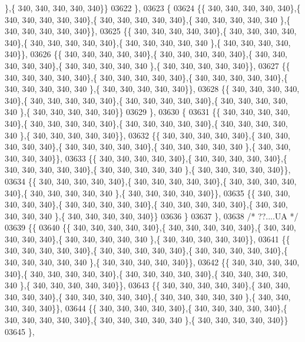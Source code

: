 \begin{DoxyCode}
      \},\{ 340, 340, 340, 340, 340\}\}
03622 \},
03623 \{
03624 \{\{ 340, 340, 340, 340, 340\},\{ 340, 340, 340, 340, 340\},\{ 340, 340, 340, 340, 340\},\{ 340, 340, 340, 340, 340
      \},\{ 340, 340, 340, 340, 340\}\},
03625 \{\{ 340, 340, 340, 340, 340\},\{ 340, 340, 340, 340, 340\},\{ 340, 340, 340, 340, 340\},\{ 340, 340, 340, 340, 340
      \},\{ 340, 340, 340, 340, 340\}\},
03626 \{\{ 340, 340, 340, 340, 340\},\{ 340, 340, 340, 340, 340\},\{ 340, 340, 340, 340, 340\},\{ 340, 340, 340, 340, 340
      \},\{ 340, 340, 340, 340, 340\}\},
03627 \{\{ 340, 340, 340, 340, 340\},\{ 340, 340, 340, 340, 340\},\{ 340, 340, 340, 340, 340\},\{ 340, 340, 340, 340, 340
      \},\{ 340, 340, 340, 340, 340\}\},
03628 \{\{ 340, 340, 340, 340, 340\},\{ 340, 340, 340, 340, 340\},\{ 340, 340, 340, 340, 340\},\{ 340, 340, 340, 340, 340
      \},\{ 340, 340, 340, 340, 340\}\}
03629 \},
03630 \{
03631 \{\{ 340, 340, 340, 340, 340\},\{ 340, 340, 340, 340, 340\},\{ 340, 340, 340, 340, 340\},\{ 340, 340, 340, 340, 340
      \},\{ 340, 340, 340, 340, 340\}\},
03632 \{\{ 340, 340, 340, 340, 340\},\{ 340, 340, 340, 340, 340\},\{ 340, 340, 340, 340, 340\},\{ 340, 340, 340, 340, 340
      \},\{ 340, 340, 340, 340, 340\}\},
03633 \{\{ 340, 340, 340, 340, 340\},\{ 340, 340, 340, 340, 340\},\{ 340, 340, 340, 340, 340\},\{ 340, 340, 340, 340, 340
      \},\{ 340, 340, 340, 340, 340\}\},
03634 \{\{ 340, 340, 340, 340, 340\},\{ 340, 340, 340, 340, 340\},\{ 340, 340, 340, 340, 340\},\{ 340, 340, 340, 340, 340
      \},\{ 340, 340, 340, 340, 340\}\},
03635 \{\{ 340, 340, 340, 340, 340\},\{ 340, 340, 340, 340, 340\},\{ 340, 340, 340, 340, 340\},\{ 340, 340, 340, 340, 340
      \},\{ 340, 340, 340, 340, 340\}\}
03636 \}
03637 \},
03638 \textcolor{comment}{/* ??....UA */}
03639 \{\{
03640 \{\{ 340, 340, 340, 340, 340\},\{ 340, 340, 340, 340, 340\},\{ 340, 340, 340, 340, 340\},\{ 340, 340, 340, 340, 340
      \},\{ 340, 340, 340, 340, 340\}\},
03641 \{\{ 340, 340, 340, 340, 340\},\{ 340, 340, 340, 340, 340\},\{ 340, 340, 340, 340, 340\},\{ 340, 340, 340, 340, 340
      \},\{ 340, 340, 340, 340, 340\}\},
03642 \{\{ 340, 340, 340, 340, 340\},\{ 340, 340, 340, 340, 340\},\{ 340, 340, 340, 340, 340\},\{ 340, 340, 340, 340, 340
      \},\{ 340, 340, 340, 340, 340\}\},
03643 \{\{ 340, 340, 340, 340, 340\},\{ 340, 340, 340, 340, 340\},\{ 340, 340, 340, 340, 340\},\{ 340, 340, 340, 340, 340
      \},\{ 340, 340, 340, 340, 340\}\},
03644 \{\{ 340, 340, 340, 340, 340\},\{ 340, 340, 340, 340, 340\},\{ 340, 340, 340, 340, 340\},\{ 340, 340, 340, 340, 340
      \},\{ 340, 340, 340, 340, 340\}\}
03645 \},

\end{DoxyCode}
